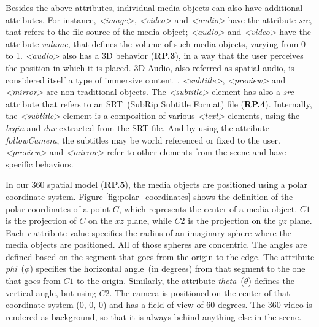 Besides the above attributes, individual media objects can also have
additional attributes.
For instance, \emph{<image>}, \emph{<video>} and \emph{<audio>} have the
attribute \emph{src}, that refers to the file source of the media object;
 \emph{<audio>} and \emph{<video>} have the attribute \emph{volume}, that
defines the volume of such media objects, varying from 0 to 1.
\textit{<audio>} also has a 3D behavior (\textbf{RP.3}), in a way that the
user perceives the position in which it is placed.
3D Audio, also referred as spatial audio, is considered itself a type of immersive content~\cite{hughes_disruptive_2019}.
\emph{<subtitle>}, \emph{<preview>} and \emph{<mirror>} are non-traditional
objects.
The \emph{<subtitle>} element has also a \emph{src} attribute that refers to an
SRT~(SubRip Subtitle Format) file (\textbf{RP.4}).
Internally, the \emph{<subtitle>} element is a composition of various
\emph{<text>} elements, using the \emph{begin} and \emph{dur} extracted from
the SRT file. 
And by using the attribute \emph{followCamera}, the subtitles may be world referenced or fixed to the user.
\emph{<preview>} and \emph{<mirror>} refer to other elements from the scene
and have specific behaviors.

In our 360 spatial model (\textbf{RP.5}), the media objects are positioned
using a polar coordinate system.
Figure \ref{fig:polar_coordinates} shows the definition of the polar
coordinates of a point $C$, which represents the center of a media object.
$C1$ is the projection of $C$ on the $xz$ plane, while $C2$ is the projection
on the $yz$ plane.
Each \emph{r} attribute value specifies the radius of an imaginary sphere
where the media objects are positioned.
All of those spheres are concentric.
The angles are defined based on the segment that goes from the origin to the
edge.
The attribute \emph{phi}~($\phi$) specifies the horizontal angle~(in degrees)
from that segment to the one that goes from $C1$ to the origin.
Similarly, the attribute \emph{theta}~($\theta$) defines the vertical angle, but using $C2$. 
The camera is positioned on the center of that coordinate system ($0$, $0$, $0$) and has a field of view of 60 degrees.
The 360 video is rendered as background, so that it is always behind anything else in the scene.


